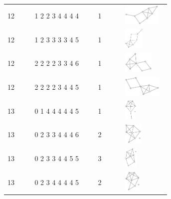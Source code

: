 \begin{table}[h!]
\begin{tabular}{m{0.15\linewidth} m{0.35\linewidth} m{0.15\linewidth} m{0.25\linewidth}}
12 & 1 2 2 3 4 4 4 4 & 1 & \includegraphics[height=1cm]{15-universal-graphs/img/degree-sequences-example-graphs/graph-4-8-23}\\
12 & 1 2 3 3 3 3 4 5 & 1 & \includegraphics[height=1cm]{15-universal-graphs/img/degree-sequences-example-graphs/graph-4-8-24}\\
12 & 2 2 2 2 3 3 4 6 & 1 & \includegraphics[height=1cm]{15-universal-graphs/img/degree-sequences-example-graphs/graph-4-8-25}\\
12 & 2 2 2 2 3 4 4 5 & 1 & \includegraphics[height=1cm]{15-universal-graphs/img/degree-sequences-example-graphs/graph-4-8-26}\\
13 & 0 1 4 4 4 4 4 5 & 1 & \includegraphics[height=1cm]{15-universal-graphs/img/degree-sequences-example-graphs/graph-4-8-27}\\
13 & 0 2 3 3 4 4 4 6 & 2 & \includegraphics[height=1cm]{15-universal-graphs/img/degree-sequences-example-graphs/graph-4-8-28}\\
13 & 0 2 3 3 4 4 5 5 & 3 & \includegraphics[height=1cm]{15-universal-graphs/img/degree-sequences-example-graphs/graph-4-8-29}\\
13 & 0 2 3 4 4 4 4 5 & 2 & \includegraphics[height=1cm]{15-universal-graphs/img/degree-sequences-example-graphs/graph-4-8-30}\\

\end{tabular}
\end{table}
